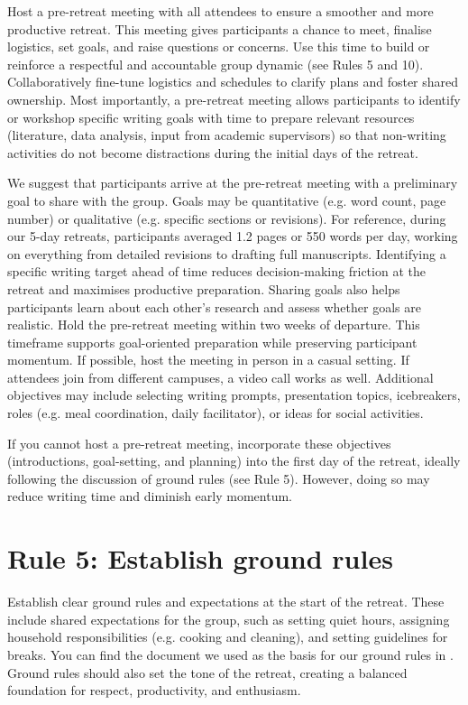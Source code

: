 \documentclass[10pt,letterpaper]{article}
\begin{document}
Host a pre-retreat meeting with all attendees to ensure a smoother and more productive retreat. This meeting gives participants a chance to meet, finalise logistics, set goals, and raise questions or concerns. Use this time to build or reinforce a respectful and accountable group dynamic (see Rules 5 and 10). Collaboratively fine-tune logistics and schedules to clarify plans and foster shared ownership. Most importantly, a pre-retreat meeting allows participants to identify or workshop specific writing goals with time to prepare relevant resources (literature, data analysis, input from academic supervisors) so that non-writing activities do not become distractions during the initial days of the retreat.

We suggest that participants arrive at the pre-retreat meeting with a preliminary goal to share with the group. Goals may be quantitative (e.g. word count, page number) or qualitative (e.g. specific sections or revisions). For reference, during our 5-day retreats, participants averaged 1.2 pages or 550 words per day, working on everything from detailed revisions to drafting full manuscripts. Identifying a specific writing target ahead of time reduces decision-making friction at the retreat and maximises productive preparation. Sharing goals also helps participants learn about each other's research and assess whether goals are realistic.
Hold the pre-retreat meeting within two weeks of departure. This timeframe supports goal-oriented preparation while preserving participant momentum. If possible, host the meeting in person in a casual setting. If attendees join from different campuses, a video call works as well. Additional objectives may include selecting writing prompts, presentation topics, icebreakers, roles (e.g. meal coordination, daily facilitator), or ideas for social activities.

If you cannot host a pre-retreat meeting, incorporate these objectives (introductions, goal-setting, and planning) into the first day of the retreat, ideally following the discussion of ground rules (see Rule 5). However, doing so may reduce writing time and diminish early momentum.

\section*{Rule 5: Establish ground rules}

Establish clear ground rules and expectations at the start of the retreat. These include shared expectations for the group, such as setting quiet hours, assigning household responsibilities (e.g. cooking and cleaning), and setting guidelines for breaks. You can find the document we used as the basis for our ground rules in . Ground rules should also set the tone of the retreat, creating a balanced foundation for respect, productivity, and enthusiasm.
\end{document}
